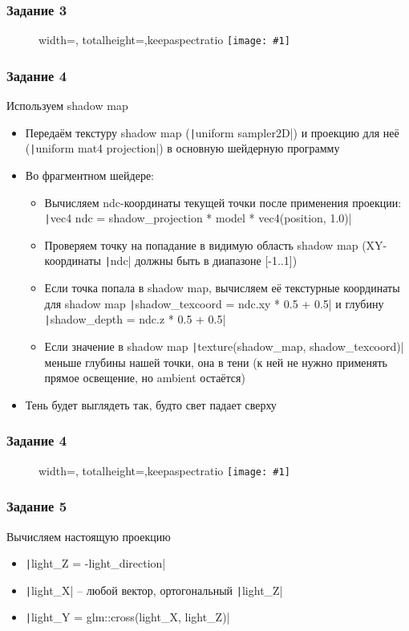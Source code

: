 \documentclass[10pt]{beamer}
\newcommand{\slideimage}[1]{
  \begin{figure}
    \begin{adjustbox}{width=\textwidth, totalheight=\textheight-2\baselineskip-2\baselineskip,keepaspectratio}
      \texttt{[image: \#1]}
    \end{adjustbox}
  \end{figure}
}
\begin{document}
\begin{frame}[fragile]
\frametitle{Задание 3}
\slideimage{3.png}
\end{frame}

\begin{frame}[fragile]
\frametitle{Задание 4}
\begin{footnotesize}
Используем shadow map
\begin{itemize}
\item Передаём текстуру shadow map (\texttt|uniform sampler2D|) и проекцию для неё (\texttt|uniform mat4 projection|) в основную шейдерную программу
\item Во фрагментном шейдере:
\begin{itemize}
\item Вычисляем ndc-координаты текущей точки после применения проекции: \texttt|vec4 ndc = shadow_projection
* model * vec4(position, 1.0)|
\item Проверяем точку на попадание в видимую область shadow map (XY-координаты \texttt|ndc| должны быть в диапазоне [-1..1])
\item Если точка попала в shadow map, вычисляем её текстурные координаты для shadow map \texttt|shadow_texcoord = ndc.xy * 0.5 + 0.5| и глубину \texttt|shadow_depth = ndc.z * 0.5 + 0.5|
\item Если значение в shadow map \texttt|texture(shadow_map, shadow_texcoord)| меньше глубины нашей точки, она в тени (к ней не нужно применять прямое освещение, но ambient остаётся)
\end{itemize}
\item Тень будет выглядеть так, будто свет падает сверху
\end{itemize}
\end{footnotesize}
\end{frame}

\begin{frame}[fragile]
\frametitle{Задание 4}
\slideimage{4.png}
\end{frame}

\begin{frame}[fragile]
\frametitle{Задание 5}
\fontsize{10pt}{10pt}
Вычисляем настоящую проекцию
\begin{itemize}
\item \texttt|light_Z = -light_direction|
\item \texttt|light_X| -- любой вектор, ортогональный \texttt|light_Z|
\item \texttt|light_Y = glm::cross(light_X, light_Z)|
\end{itemize}
\end{frame}
\end{document}
